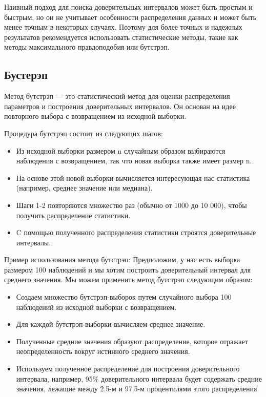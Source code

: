 \documentclass[specialist,
               substylefile = spbu_report.rtx,
               subf,href,colorlinks=true, 12pt]{disser}
\begin{document}
Наивный подход для поиска доверительных интервалов может быть простым и быстрым, но он не учитывает особенности распределения данных и может быть менее точным в некоторых случаях. Поэтому для более точных и надежных результатов рекомендуется использовать статистические методы, такие как методы максимального правдоподобия или бутстрэп.

\subsection{Бустерэп}

Метод бутстрэп — это статистический метод для оценки распределения параметров и построения доверительных интервалов. Он основан на идее повторного выбора с возвращением из исходной выборки.

Процедура бутстрэп состоит из следующих шагов:
\begin{itemize}
    \item Из исходной выборки размером n случайным образом выбираются наблюдения с возвращением, так что новая выборка также имеет размер n.
    \item На основе этой новой выборки вычисляется интересующая нас статистика (например, среднее значение или медиана).
    \item Шаги 1-2 повторяются множество раз (обычно от 1000 до 10 000), чтобы получить распределение статистики.
    \item C помощью полученного распределения статистики строятся доверительные интервалы.
\end{itemize}
Пример использования метода бутстрэп:
\newline
Предположим, у нас есть выборка размером 100 наблюдений и мы хотим построить доверительный интервал для среднего значения. Мы можем применить метод бутстрэп следующим образом:

\begin{itemize}
    \item Создаем множество бутстрэп-выборок путем случайного выбора 100 наблюдений из исходной выборки с возвращением.
    \item Для каждой бутстрэп-выборки вычисляем среднее значение.
    \item Полученные средние значения образуют распределение, которое отражает неопределенность вокруг истинного среднего значения.
    \item Используем полученное распределение для построения доверительного интервала, например, 95\% доверительного интервала будет содержать средние значения, лежащие между 2.5-м и 97.5-м процентилями этого распределения.
\end{itemize}
\end{document}
